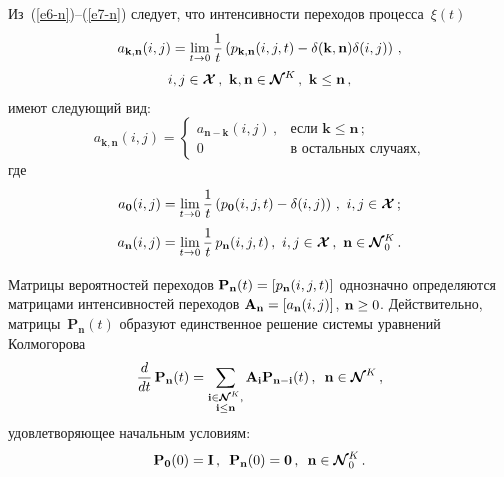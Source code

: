 {\begin{multicols}{2}
  Из~(\ref{e6-n})--(\ref{e7-n}) следует, что интенсивности переходов 
процесса~$\xi(t)$
  \begin{multline*}
  a_{\mathbf{k},\mathbf{n}}(i,j)=\lim\limits_{t\to0} \displaystyle\frac{\displaystyle 1\mathstrut}{\displaystyle t\mathstrut}\left( 
p_{\mathbf{k},\mathbf{n}}(i,j,t)-\delta (\mathbf{k},\mathbf{n})\delta(i,j)\right)\,,\\
  i,j\in \boldsymbol{\mathcal{X}}\,,\ \mathbf{k},\mathbf{n}\in 
\boldsymbol{\mathcal{N}}^K\,,\ \mathbf{k}\leq \mathbf{n}\,,
  \end{multline*}
имеют следующий вид:
\begin{equation*}
a_{\mathbf{k},\mathbf{n}}(i,j)=\begin{cases}
a_{\mathbf{n}-\mathbf{k}}(i,j)\,, & 
\mbox{если } \mathbf{k}\leq \mathbf{n}\,;\\
0 & \mbox{в\ остальных\ случаях},
\end{cases}
\end{equation*}
где
\begin{align*}
a_{\mathbf{0}} (i,j) &= \lim\limits_{t\to 0}\displaystyle\frac{\displaystyle 1\mathstrut}{\displaystyle t\mathstrut}\left( p_{\mathbf{0}}
(i,j,t)-\delta(i,j)\right)\,,\ i,j\in \boldsymbol{\mathcal{X}}\,;
\\
a_{\mathbf{n}} (i,j) & =\lim\limits_{t\to 0}\displaystyle\frac{\displaystyle 1\mathstrut}{\displaystyle t\mathstrut}\,
p_{\mathbf{n}}(i,j,t)\,,\ i,j\in 
\boldsymbol{\mathcal{X}}\,,\ \mathbf{n}\in \boldsymbol{\mathcal{N}}^K_0\,.
\end{align*}
  
  Матрицы вероятностей переходов $\mathbf{P}_{\mathbf{n}}(t)\hm= 
[p_{\mathbf{n}}(i,j,t)]$ однозначно определяются матрицами интенсивностей 
переходов $\mathbf{A}_{\mathbf{n}}\hm= [a_{\mathbf{n}}(i, j)]$,\linebreak 
$\mathbf{n}\hm\geq 0$. Действительно, 
матрицы~$\mathbf{P}_{\mathbf{n}}(t)$ образуют единственное решение 
системы уравнений Кол\-мо\-го\-рова
  \begin{equation}
  \displaystyle\frac{\displaystyle d\mathstrut}{\displaystyle dt\mathstrut}\,\mathbf{P}_{\mathbf{n}}(t)=
  \sum\limits_{{\substack{{\mathbf{i}\in 
\boldsymbol{\mathcal{N}}^K},\\
{\mathbf{i}\leq\mathbf{n}}}} }\mathbf{A}_{\mathbf{i}}\mathbf{P}_{\mathbf{n}-
\mathbf{i}} (t)\,,\enskip \mathbf{n}\in \boldsymbol{\mathcal{N}}^K\,,
  \label{e13-n}
  \end{equation}
удовлетворяющее начальным условиям:
\begin{equation}
\mathbf{P}_{\mathbf{
0}}(0)= \mathbf{I}\,,\enskip \mathbf{P}_{\mathbf{n}}(0)= \mathbf{0}\,,\enskip 
\mathbf{n}\in \boldsymbol{\mathcal{N}}_0^K\,.
\label{e14-n}
\end{equation}
  

\end{multicols}}
